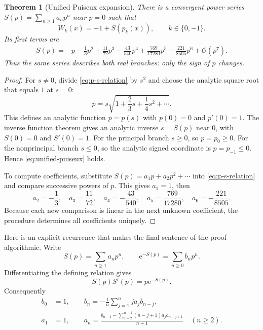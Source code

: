 \documentclass[11pt]{article}
\newtheorem{theorem}{Theorem}[section]
\theoremstyle{remark}
\newcommand{\ee}{\mathrm e}
\newcommand{\bigO}{\mathcal O}
\begin{document}
\begin{theorem}[Unified Puiseux expansion]\label{thm:puiseux}
There is a convergent power series \(S(p)=\sum_{n\geq1}a_np^n\) near
\(p=0\) such that
\begin{equation}\label{eq:unified-puiseux}
       W_k(x)=-1+S(p_k(x)),\qquad k\in\{0,-1\}.
\end{equation}
Its first terms are
\begin{align}
 S(p)={}&p-\frac13p^2+\frac{11}{72}p^3-\frac{43}{540}p^4
       +\frac{769}{17280}p^5-\frac{221}{8505}p^6
       +\bigO(p^7).\label{eq:puiseux-series}
\end{align}
Thus the same series describes both real branches: only the sign of \(p\)
changes.
\end{theorem}

\begin{proof}
For \(s\neq0\), divide \eqref{eq:p-s-relation} by \(s^2\) and choose the
analytic square root that equals \(1\) at \(s=0\):
\[
 p=s\sqrt{1+\frac23s+\frac14s^2+\cdots}.
\]
This defines an analytic function \(p=p(s)\) with \(p(0)=0\) and
\(p'(0)=1\).  The inverse function theorem gives an analytic inverse
\(s=S(p)\) near \(0\), with \(S(0)=0\) and \(S'(0)=1\).
For the principal branch \(s\geq0\), so \(p=p_0\geq0\).  For the
nonprincipal branch \(s\leq0\), so the analytic signed coordinate is
\(p=p_{-1}\leq0\).  Hence \eqref{eq:unified-puiseux} holds.

To compute coefficients, substitute
\(S(p)=a_1p+a_2p^2+\cdots\) into \eqref{eq:p-s-relation} and compare
successive powers of \(p\).  This gives \(a_1=1\), then
\[
 a_2=-\frac13,\quad a_3=\frac{11}{72},\quad
 a_4=-\frac{43}{540},\quad
 a_5=\frac{769}{17280},\quad
 a_6=-\frac{221}{8505}.
\]
Because each new comparison is linear in the next unknown coefficient, the
procedure determines all coefficients uniquely.
\end{proof}

Here is an explicit recurrence that makes the final sentence of the proof
algorithmic.  Write
\[
 S(p)=\sum_{n\geq1}a_np^n,\qquad
 \ee^{-S(p)}=\sum_{n\geq0}b_np^n.
\]
Differentiating the defining relation gives
\[
       S(p)S'(p)=p\ee^{-S(p)}.
\]
Consequently
\begin{align}
 b_0&=1,\qquad
 b_n=-\frac1n\sum_{j=1}^n j a_jb_{n-j},\label{eq:brec}\\
 a_1&=1,\qquad
 a_n=\frac{b_{n-1}
 -\displaystyle\sum_{j=2}^{n-1}(n-j+1)a_ja_{n-j+1}}
 {n+1}\quad(n\geq2).\label{eq:arec}
\end{align}
\end{document}

